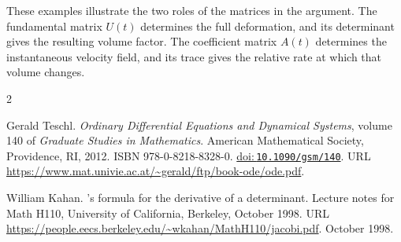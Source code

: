\documentclass[a4paper,11pt]{article}
\newcommand{\doi}[1]{\href{https://doi.org/#1}{doi:\,\nolinkurl{#1}}}
\numberwithin{equation}{section}
\begin{document}
These examples illustrate the two roles of the matrices in the argument.
The fundamental matrix $U(t)$ determines the full deformation, and its
determinant gives the resulting volume factor. The coefficient matrix
$A(t)$ determines the instantaneous velocity field, and its trace gives
the relative rate at which that volume changes.

\begin{thebibliography}{2}

Gerald Teschl.
\newblock \emph{Ordinary Differential Equations and Dynamical Systems}, volume
  140 of \emph{Graduate Studies in Mathematics}.
\newblock American Mathematical Society, Providence, RI, 2012.
\newblock ISBN 978-0-8218-8328-0.
\newblock \doi{10.1090/gsm/140}.
\newblock URL \url{https://www.mat.univie.ac.at/~gerald/ftp/book-ode/ode.pdf}.

William Kahan.
's formula for the derivative of a determinant.
\newblock Lecture notes for Math H110, University of California, Berkeley,
  October 1998.
\newblock URL
  \url{https://people.eecs.berkeley.edu/~wkahan/MathH110/jacobi.pdf}.
 October 1998.

\end{thebibliography}
\end{document}

